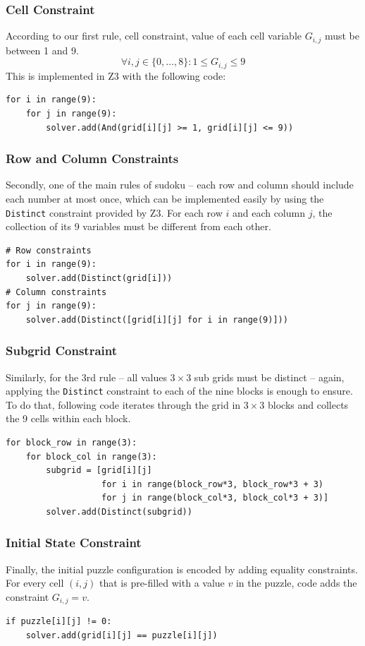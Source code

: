 \documentclass[12pt, a4paper, oneside]{report} %
\begin{document}
\subsubsection{Cell Constraint}
According to our first rule, cell constraint, value of each cell variable $G_{i,j}$ must be between 1 and 9.
$$ \forall i,j \in \{0, \dots, 8\}: 1 \le G_{i,j} \le 9 $$
This is implemented in Z3 with the following code:
\begin{verbatim}
for i in range(9):
    for j in range(9):
        solver.add(And(grid[i][j] >= 1, grid[i][j] <= 9))
\end{verbatim}

\subsubsection{Row and Column Constraints}
Secondly, one of the main rules of sudoku -- each row and column should include each number at most once, which can be implemented easily by using the 
\texttt{Distinct} constraint provided by Z3. For each row $i$ and each column $j$, the collection of its 9 variables must be different from each other.
\begin{verbatim}
# Row constraints
for i in range(9):
    solver.add(Distinct(grid[i]))
# Column constraints
for j in range(9):
    solver.add(Distinct([grid[i][j] for i in range(9)]))
\end{verbatim}

\subsubsection{Subgrid Constraint}
Similarly, for the 3rd rule -- all values $3 \times 3$ sub grids must be distinct -- again, applying the \texttt{Distinct} constraint to each of the nine blocks is enough to ensure. To do that, following code iterates through the grid in $3 \times 3$ blocks and collects the 9 cells within each block.
\begin{verbatim}
for block_row in range(3):
    for block_col in range(3):
        subgrid = [grid[i][j] 
                   for i in range(block_row*3, block_row*3 + 3) 
                   for j in range(block_col*3, block_col*3 + 3)]
        solver.add(Distinct(subgrid))
\end{verbatim}

\subsubsection{Initial State Constraint}
Finally, the initial puzzle configuration is encoded by adding equality constraints. For every cell $(i, j)$ that is pre-filled with a value $v$ in the puzzle, code adds the constraint $G_{i,j} = v$.
\begin{verbatim}
if puzzle[i][j] != 0:
    solver.add(grid[i][j] == puzzle[i][j])
\end{verbatim}
\end{document}
